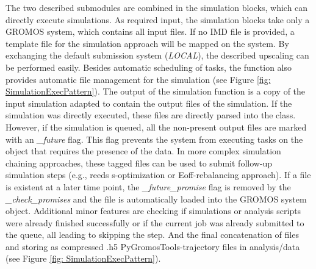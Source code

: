 The two described submodules are combined in the simulation blocks, which can directly execute simulations. As required input, the simulation blocks take only a GROMOS system, which contains all input files. If no IMD file is provided, a template file for the simulation approach will be mapped on the system. By exchanging the default submission system (\textit{LOCAL}), the described upscaling can be performed easily. Besides automatic scheduling of tasks, the function also provides automatic file management for the simulation (see Figure \ref{fig: SimulationExecPattern}). The output of the simulation function is a copy of the input simulation adapted to contain the output files of the simulation. If the simulation was directly executed, these files are directly parsed into the class. However, if the simulation is queued, all the non-present output files are marked with an \textit{\_future} flag. This flag prevents the system from executing tasks on the object that requires the presence of the data. In more complex simulation chaining approaches, these tagged files can be used to submit follow-up simulation steps (e.g., reeds s-optimization or Eoff-rebalancing approach). If a file is existent at a later time point, the \textit{\_future\_promise} flag is removed by the \textit{\_check\_promises} and the file is automatically loaded into the GROMOS system object.
Additional minor features are checking if simulations or analysis scripts were already finished successfully or if the current job was already submitted to the queue, all leading to skipping the step. And the final concatenation of files and storing as compressed .h5 PyGromosTools-trajectory files in analysis/data (see Figure \ref{fig: SimulationExecPattern}).


